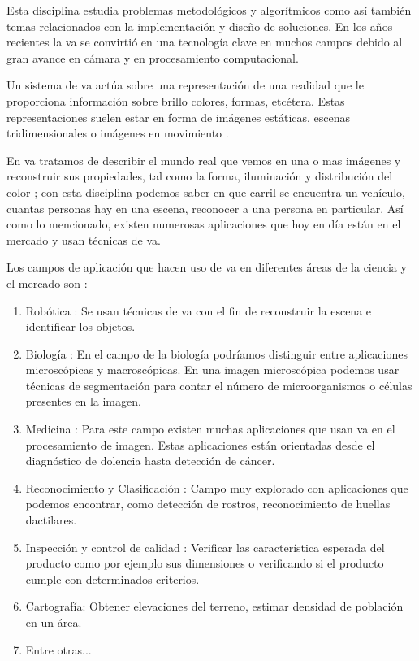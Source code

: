 \begin{center}
\begin{minipage}{0.7\linewidth}  \vspace{5pt}{\small La visión por computadora tiene como objetivo el uso de cámaras para analizar o entender escenas en el mundo real.}
\begin{flushright}
  \citep{Reinhard}
\end{flushright}
\vspace{5pt}
\end{minipage}
\end{center}

Esta disciplina estudia problemas metodológicos y algorítmicos como así también temas relacionados con la implementación y diseño de soluciones. En los años recientes la \ac{va} se convirtió en una tecnología clave en muchos campos debido al gran avance en cámara y en procesamiento computacional.

Un sistema de \ac{va} actúa sobre una representación de una realidad que le proporciona información sobre brillo colores, formas, etcétera. Estas representaciones suelen estar en forma de imágenes estáticas, escenas tridimensionales o imágenes en movimiento \citep{Ledda}. 

En \ac{va} tratamos de describir el mundo real que vemos en una o mas imágenes y reconstruir sus propiedades, tal como la forma, iluminación y distribución del color \citep{Szeliski}; con esta disciplina podemos saber en que carril se encuentra un vehículo, cuantas personas hay en una escena, reconocer a una persona en particular. Así como lo mencionado, existen numerosas aplicaciones que hoy en día están en el mercado  y usan técnicas de \ac{va}. 

Los campos de aplicación que hacen uso de \ac{va} en diferentes áreas de la ciencia y el mercado son \citep{areascv} :
\begin{enumerate}
\item Robótica : Se usan técnicas de \ac{va} con el fin de reconstruir la escena e identificar los objetos.
\item Biología : En el campo de la biología podríamos distinguir entre aplicaciones microscópicas y macroscópicas. En una imagen microscópica  podemos  usar técnicas de segmentación para contar el número de microorganismos o células presentes en la imagen.
\item Medicina : Para este campo existen muchas aplicaciones que usan \ac{va} en el procesamiento de imagen. Estas aplicaciones están orientadas desde el diagnóstico de dolencia hasta detección de cáncer. 
\item  Reconocimiento y Clasificación : Campo muy explorado con aplicaciones que podemos encontrar, como detección de rostros, reconocimiento de huellas dactilares.
\item Inspección y control de calidad : Verificar las característica esperada del producto como por ejemplo sus dimensiones o verificando si el producto cumple con determinados criterios.
\item  Cartografía: Obtener elevaciones del terreno, estimar densidad de población en un área.
\item Entre otras...
\end{enumerate}

